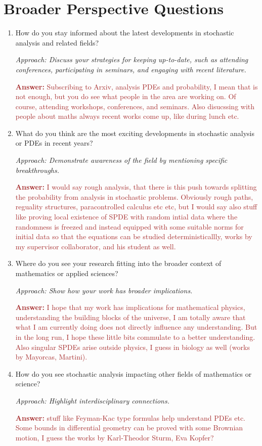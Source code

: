 \documentclass[12pt]{article}
\numberwithin{equation}{section}
\newcommand{\brown}[1]{\textcolor{brown}{#1}}
\begin{document}
\section{Broader Perspective Questions}
\begin{enumerate}
    \item How do you stay informed about the latest developments in stochastic analysis and related fields?
    
    \textit{Approach: Discuss your strategies for keeping up-to-date, such as attending conferences, participating in seminars, and engaging with recent literature.}

    \brown{\textbf{Answer:} Subscribing to Arxiv, analysis PDEs and probability, I mean that is not enough, but you do see what people in the area are working on. Of course, attending workshops, conferences, and seminars. Also disucssing with people about maths always recent works come up, like during lunch etc.}

    \item What do you think are the most exciting developments in stochastic analysis or PDEs in recent years?
    
    \textit{Approach: Demonstrate awareness of the field by mentioning specific breakthroughs.}

    \brown{\textbf{Answer:} I would say rough analysis, that there is this push towards splitting the probability from analysis in stochastic problems. Obviously rough paths, reguality structures, paracontrolled calculus etc etc, but I would say also stuff like proving local existence of SPDE with random intial data where the randomness is freezed and instead equipped with some suitable norms for initial data so that the equations can be studied deterministicallly, works by my supervisor collaborator, and his student as well. }

    \item Where do you see your research fitting into the broader context of mathematics or applied sciences?
    
    \textit{Approach: Show how your work has broader implications.}

    \brown{\textbf{Answer:} I hope that my work has implications for mathematical physics, understanding the building blocks of the universe, I am totally aware that what I am currently doing does not directly influence any understanding. But in the long run, I hope these little bits commulate to a better understanding. Also singular SPDEs arise outside physics, I guess in biology as well (works by Mayorcas, Martini). }

    \item How do you see stochastic analysis impacting other fields of mathematics or science?
    
    \textit{Approach: Highlight interdisciplinary connections.}

    \brown{\textbf{Answer:} stuff like Feyman-Kac type formulas help understand PDEs etc. Some bounds in differential geometry can be proved with some Brownian motion, I guess the works by Karl-Theodor Sturm, Eva Kopfer?}

   

\end{enumerate}
\end{document}

